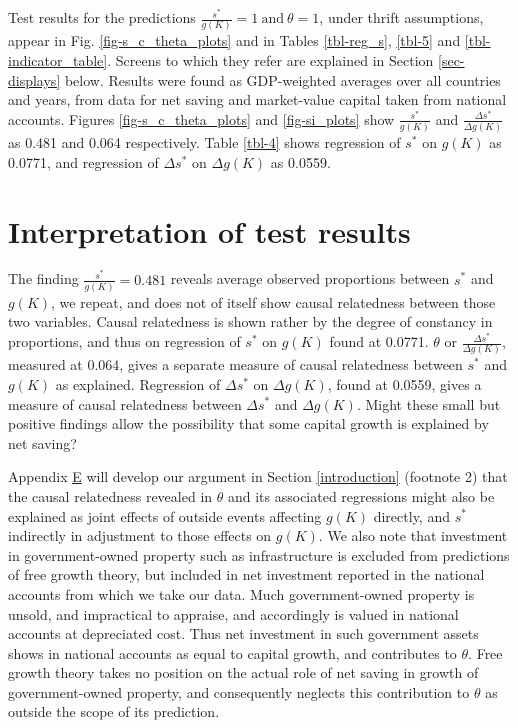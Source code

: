 \documentclass[a4padisinvitingper,fleqn]{latex_styles/cas-sc}
\begin{document}
Test results for the predictions \(\frac{s^*}{g(K)} = 1\ \text{and}\ \theta = 1\), under thrift assumptions, appear in Fig. \ref{fig-s_c_theta_plots} and in Tables \ref{tbl-reg_s}, \ref{tbl-5} and \ref{tbl-indicator_table}. Screens to which they refer are explained in Section \ref{sec-displays} below. Results were found as GDP-weighted averages over all countries and years, from data for net saving and market-value capital taken from national accounts. 
Figures \ref{fig-s_c_theta_plots} and \ref{fig-si_plots} show \(\frac{s^*}{g(K)}\) and \(\frac{\Delta s^*}{\Delta g(K)}\) as 0.481 and 0.064 respectively. Table \ref{tbl-4} shows regression of \(s^*\) on \(g(K)\) as 0.0771, and regression of \(\Delta s^*\) on \(\Delta g(K)\) as 0.0559.

\section{Interpretation of test results\label{interpretation-of-test-results}}


The finding \(\frac{s^*}{g(K)} = 0.481\) reveals average observed proportions between \(s^*\) and \(g(K)\), we repeat, and does not of itself show causal relatedness between those two variables. Causal relatedness is shown rather by the degree of constancy in proportions, and thus on regression of \(s^*\) on \(g(K)\) found at 0.0771. \(\theta\) or \(\frac{\Delta s^*}{\Delta g(K)}\), measured at \(0.064\), gives a separate measure of causal relatedness between \(s^*\) and \(g(K)\) as explained. Regression of \(\Delta s^*\) on \(\Delta g(K)\), found at 0.0559, gives a measure of causal relatedness between \(\Delta s^*\) and \(\Delta g(K)\). Might these small but positive findings allow the possibility that some capital growth is explained by net saving?

Appendix \hyperref[appendix-e]{E} will develop our argument in Section \ref{introduction} (footnote 2) that the causal relatedness revealed in \(\theta\) and its associated regressions might also be explained as joint effects of outside events affecting \(g(K)\) directly, and \(s^*\) indirectly in adjustment to those effects on \(g(K)\). We also note that investment in government-owned property such as infrastructure is excluded from predictions of free growth theory, but included in net investment reported in the national accounts from which we take our data. Much government-owned property is unsold, and impractical to appraise, and accordingly is valued in national accounts at depreciated cost. Thus net investment in such government assets shows in national accounts as equal to capital growth, and contributes to \(\theta\). Free growth theory takes no position on the actual role of net saving in growth of government-owned property, and consequently neglects this contribution to \(\theta\) as outside the scope of its prediction.
\end{document}
